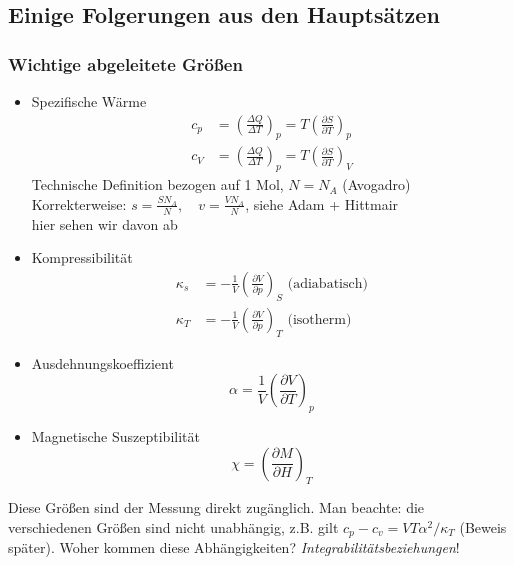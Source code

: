 \subsection{Einige Folgerungen aus den Hauptsätzen}
\subsubsection{Wichtige abgeleitete Größen}
\begin{itemize}
    \item Spezifische Wärme
    \begin{equation}
        \begin{split}
            c_p &= \left( \frac{\Delta Q}{\Delta T} \right)_p = T \left( \frac{\partial S}{\partial T} \right)_p \\
            c_V &= \left( \frac{\Delta Q}{\Delta T} \right)_p = T \left( \frac{\partial S}{\partial T} \right)_V
        \end{split}
    \end{equation}
    Technische Definition bezogen auf 1 Mol, $N=N_A$ (Avogadro) \\
    Korrekterweise: $s = \frac{S N_A}{N}, \quad v = \frac{V N_A}{N}$, siehe Adam + Hittmair \\
    hier sehen wir davon ab
    \item Kompressibilität
    \begin{equation}
        \begin{split}
            \kappa_s &= - \frac{1}{V} \left( \frac{\partial V}{\partial p} \right)_S \text{ (adiabatisch)} \\
            \kappa_T &= - \frac{1}{V} \left( \frac{\partial V}{\partial p} \right)_T \text{ (isotherm)}
        \end{split}
    \end{equation}
    \item Ausdehnungskoeffizient
    \begin{equation}
        \alpha = \frac{1}{V} \left( \frac{\partial V}{\partial T} \right)_p
    \end{equation}
    \item Magnetische Suszeptibilität
    \begin{equation}
        \chi = \left( \frac{\partial M}{\partial H} \right)_T
    \end{equation}
\end{itemize}
Diese Größen sind der Messung direkt zugänglich. Man beachte: die verschiedenen Größen sind nicht unabhängig, z.B. gilt
$c_p - c_v = V T \alpha^2 / \kappa_T$ (Beweis später).
Woher kommen diese Abhängigkeiten? \emph{Integrabilitätsbeziehungen}!
